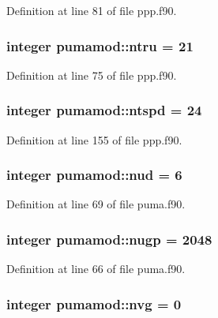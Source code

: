\-Definition at line 81 of file ppp.\-f90.

\hypertarget{classpumamod_ae619e60539d80754ec4298f0fdc6724e}{
\subsubsection[{ntru}]{\setlength{\rightskip}{0pt plus 5cm}integer {\bf pumamod\-::ntru} = 21}}
\label{classpumamod_ae619e60539d80754ec4298f0fdc6724e}


\-Definition at line 75 of file ppp.\-f90.

\hypertarget{classpumamod_a4e689422a383ca3ce7c337c46c66dc71}{
\subsubsection[{ntspd}]{\setlength{\rightskip}{0pt plus 5cm}integer {\bf pumamod\-::ntspd} = 24}}
\label{classpumamod_a4e689422a383ca3ce7c337c46c66dc71}


\-Definition at line 155 of file ppp.\-f90.

\hypertarget{classpumamod_ab963b44aa3f4546a551dd941e4e322c8}{
\subsubsection[{nud}]{\setlength{\rightskip}{0pt plus 5cm}integer {\bf pumamod\-::nud} = 6}}
\label{classpumamod_ab963b44aa3f4546a551dd941e4e322c8}


\-Definition at line 69 of file puma.\-f90.

\hypertarget{classpumamod_aa9e811d28ba93c3dadb44bc26ae09600}{
\subsubsection[{nugp}]{\setlength{\rightskip}{0pt plus 5cm}integer {\bf pumamod\-::nugp} = 2048}}
\label{classpumamod_aa9e811d28ba93c3dadb44bc26ae09600}


\-Definition at line 66 of file puma.\-f90.

\hypertarget{classpumamod_a24838036db3be03c1a4b61262d662f89}{
\subsubsection[{nvg}]{\setlength{\rightskip}{0pt plus 5cm}integer {\bf pumamod\-::nvg} = 0}}
\label{classpumamod_a24838036db3be03c1a4b61262d662f89}


